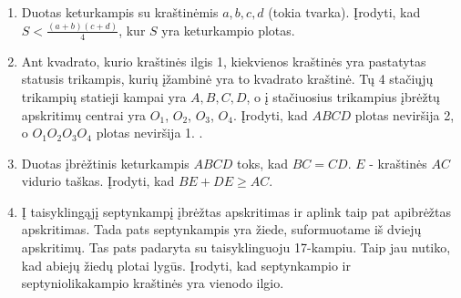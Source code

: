 \begin{enumerate}
\item Duotas keturkampis su kraštinėmis $a,b,c,d$ (tokia tvarka).
  Įrodyti, kad $S<\frac{(a+b)(c+d)}{4}$, kur $S$ yra keturkampio
  plotas.
  
\item Ant kvadrato, kurio kraštinės ilgis 1, kiekvienos
  kraštinės yra pastatytas statusis trikampis, kurių
  įžambinė yra to kvadrato kraštinė. Tų 4 stačiųjų trikampių
  statieji kampai yra $A, B, C, D$, o į stačiuosius trikampius
  įbrėžtų apskritimų centrai yra $O_1$, $O_2$, $O_3$, $O_4$.
  Įrodyti, kad $ABCD$ plotas neviršija 2, o $O_1O_2O_3O_4$
  plotas neviršija 1.
.

\item Duotas įbrėžtinis keturkampis $ABCD$ toks, kad
  $BC=CD$. $E$ - kraštinės $AC$ vidurio taškas. Įrodyti, kad
  $BE+DE\geq AC$.
\item Į taisyklingąjį septynkampį įbrėžtas apskritimas ir
  aplink taip pat apibrėžtas apskritimas. Tada pats
  septynkampis yra žiede, suformuotame iš dviejų apskritimų.
  Tas pats padaryta su taisyklinguoju 17-kampiu. Taip jau
  nutiko, kad abiejų žiedų plotai lygūs. Įrodyti, kad
  septynkampio ir septyniolikakampio kraštinės yra vienodo
  ilgio.


\end{enumerate}
